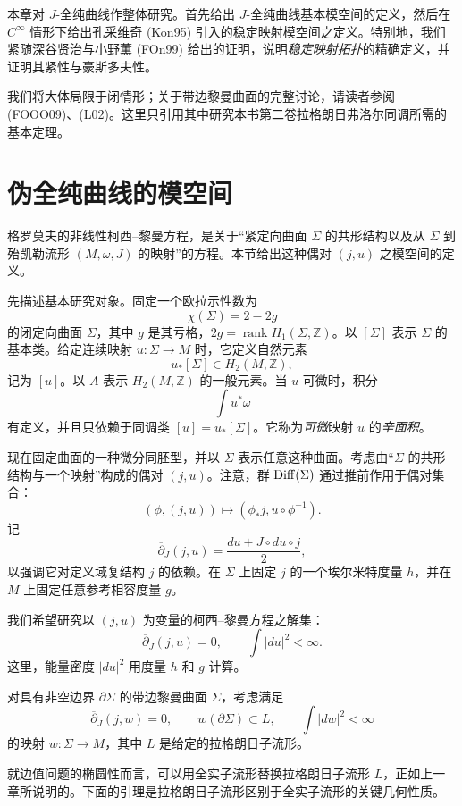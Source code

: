 本章对 $J$-全纯曲线作整体研究。首先给出 $J$-全纯曲线基本模空间的定义，然后在 $C^\infty$ 情形下给出孔采维奇 (Kon95) 引入的稳定映射模空间之定义。特别地，我们紧随深谷贤治与小野薫 (FOn99) 给出的证明，说明\emph{稳定映射拓扑}的精确定义，并证明其紧性与豪斯多夫性。

我们将大体局限于闭情形；关于带边黎曼曲面的完整讨论，请读者参阅 (FOOO09)、(L02)。这里只引用其中研究本书第二卷拉格朗日弗洛尔同调所需的基本定理。

\section{伪全纯曲线的模空间}
\label{sec:moduli-space-pseudoholomorphic-curves}

格罗莫夫的非线性柯西--黎曼方程，是关于“紧定向曲面 $\Sigma$ 的共形结构以及从 $\Sigma$ 到殆凯勒流形 $(M,\omega,J)$ 的映射”的方程。本节给出这种偶对 $(j,u)$ 之模空间的定义。

先描述基本研究对象。固定一个欧拉示性数为
\[
 \chi(\Sigma)=2-2g
\]
的闭定向曲面 $\Sigma$，其中 $g$ 是其亏格，$2g=\operatorname{rank}H_1(\Sigma,\mathbb Z)$。以 $[\Sigma]$ 表示 $\Sigma$ 的基本类。给定连续映射 $u:\Sigma\to M$ 时，它定义自然元素
\[
 u_*[\Sigma]\in H_2(M,\mathbb Z),
\]
记为 $[u]$。以 $A$ 表示 $H_2(M,\mathbb Z)$ 的一般元素。当 $u$ 可微时，积分
\[
 \int u^*\omega
\]
有定义，并且只依赖于同调类 $[u]=u_*[\Sigma]$。它称为\emph{可微}映射 $u$ 的\emph{辛面积}。

现在固定曲面的一种微分同胚型，并以 $\Sigma$ 表示任意这种曲面。考虑由“$\Sigma$ 的共形结构与一个映射”构成的偶对 $(j,u)$。注意，群 $\operatorname{Diff}(\Sigma)$ 通过推前作用于偶对集合：
\[
 (\phi,(j,u))\longmapsto(\phi_*j,u\circ\phi^{-1}).
\]
记
\[
 \overline\partial_J(j,u)=\frac{du+J\circ du\circ j}{2},
\]
以强调它对定义域复结构 $j$ 的依赖。在 $\Sigma$ 上固定 $j$ 的一个埃尔米特度量 $h$，并在 $M$ 上固定任意参考相容度量 $g$。

我们希望研究以 $(j,u)$ 为变量的柯西--黎曼方程之解集：
\[
 \overline\partial_J(j,u)=0,
 \qquad \int|du|^2<\infty.
\]
这里，能量密度 $|du|^2$ 用度量 $h$ 和 $g$ 计算。

对具有非空边界 $\partial\Sigma$ 的带边黎曼曲面 $\Sigma$，考虑满足
\[
 \overline\partial_J(j,w)=0,
 \qquad w(\partial\Sigma)\subset L,
 \qquad \int|dw|^2<\infty
\]
的映射 $w:\Sigma\to M$，其中 $L$ 是给定的拉格朗日子流形。

就边值问题的椭圆性而言，可以用全实子流形替换拉格朗日子流形 $L$，正如上一章所说明的。下面的引理是拉格朗日子流形区别于全实子流形的关键几何性质。


